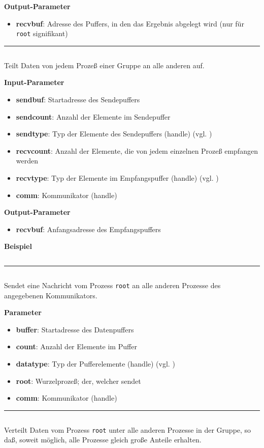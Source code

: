 \textbf{Output-Parameter}
\begin{itemize}
    \item \textbf{recvbuf}: Adresse des Puffers, in den das Ergebnis abgelegt wird (nur für \texttt{root} signifikant)
\end{itemize}
\goodbreak
\rule{\textwidth}{0.4pt}%
\inputminted[numbersep=5pt, tabsize=4]{c}{scripts/mpi/mpi-alltoall.c}
Teilt Daten von jedem Prozeß einer Gruppe an alle anderen auf.

\textbf{Input-Parameter}
\begin{itemize}
    \item \textbf{sendbuf}: Startadresse des Sendepuffers
    \item \textbf{sendcount}: Anzahl der Elemente im Sendepuffer
    \item \textbf{sendtype}: Typ der Elemente des Sendepuffers (handle) (vgl. )
    \item \textbf{recvcount}: Anzahl der Elemente, die von jedem einzelnen Prozeß empfangen werden
    \item \textbf{recvtype}: Typ der Elemente im Empfangspuffer (handle) (vgl. )
    \item \textbf{comm}: Kommunikator (handle)
\end{itemize}

\textbf{Output-Parameter}
\begin{itemize}
    \item \textbf{recvbuf}: Anfangsadresse des Empfangspuffers
\end{itemize}

\textbf{Beispiel}
\inputminted[numbersep=5pt, tabsize=4]{c}{scripts/mpi/mpi-alltoall-example.c}
\goodbreak
\rule{\textwidth}{0.4pt}%
\inputminted[numbersep=5pt, tabsize=4]{c}{scripts/mpi/mpi-bcast.c}
Sendet eine Nachricht vom Prozess \texttt{root} an alle anderen Prozesse des
angegebenen Kommunikators.

\textbf{Parameter}
\begin{itemize}
    \item \textbf{buffer}: Startadresse des Datenpuffers
    \item \textbf{count}: Anzahl der Elemente im Puffer
    \item \textbf{datatype}: Typ der Pufferelemente (handle) (vgl. )
    \item \textbf{root}: Wurzelprozeß; der, welcher sendet
    \item \textbf{comm}: Kommunikator (handle)
\end{itemize}
\goodbreak
\rule{\textwidth}{0.4pt}%
\inputminted[numbersep=5pt, tabsize=4]{c}{scripts/mpi/mpi-scatter.c}
Verteilt Daten vom Prozess \texttt{root} unter alle anderen Prozesse in der Gruppe, so daß, soweit möglich, alle Prozesse gleich große Anteile erhalten.

